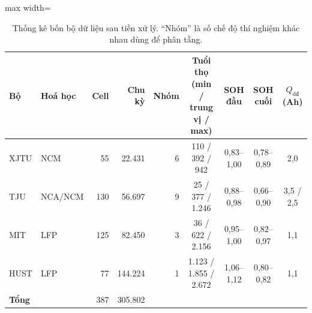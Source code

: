 \begin{table}[!htbp]\centering\footnotesize
\caption[Thống kê bốn bộ dữ liệu sau tiền xử lý]{Thống kê bốn bộ dữ liệu sau tiền xử lý. “Nhóm” là số chế độ thí nghiệm khác nhau dùng để phân tầng.}\label{tab:datastats}
\begin{adjustbox}{max width=\textwidth}\begin{tabular}{llrrrcccc}\toprule
Bộ & Hoá học & Cell & Chu kỳ & Nhóm & Tuổi thọ (min / trung vị / max) & SOH đầu & SOH cuối & $Q_\text{dđ}$ (Ah) \\\midrule
XJTU & NCM & 55 & 22.431 & 6 & 110 / 392 / 942 & 0{,}83--1{,}00 & 0{,}78--0{,}89 & 2,0 \\
TJU & NCA/NCM & 130 & 56.697 & 9 & 25 / 377 / 1.246 & 0{,}88--0{,}98 & 0{,}66--0{,}90 & 3,5 / 2,5 \\
MIT & LFP & 125 & 82.450 & 3 & 36 / 622 / 2.156 & 0{,}95--1{,}00 & 0{,}82--0{,}97 & 1,1 \\
HUST & LFP & 77 & 144.224 & 1 & 1.123 / 1.855 / 2.672 & 1{,}06--1{,}12 & 0{,}80--0{,}82 & 1,1 \\
\textbf{Tổng} &  & 387 & 305.802 &  &  &  &  &  \\
\bottomrule\end{tabular}\end{adjustbox}\end{table}
